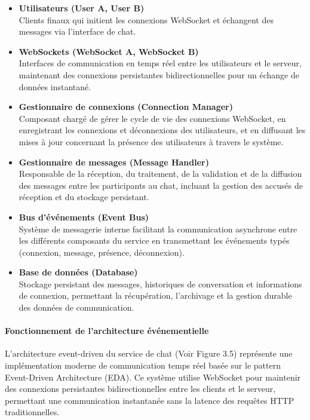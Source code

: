 \documentclass[12pt]{rapportPfe}
\begin{document}
\begin{itemize}
    \item \textbf{Utilisateurs (User A, User B)} \\
    Clients finaux qui initient les connexions WebSocket et échangent des messages via l'interface de chat.
    
    \item \textbf{WebSockets (WebSocket A, WebSocket B)} \\
    Interfaces de communication en temps réel entre les utilisateurs et le serveur, maintenant des connexions persistantes bidirectionnelles pour un échange de données instantané.
    
    \item \textbf{Gestionnaire de connexions (Connection Manager)} \\
    Composant chargé de gérer le cycle de vie des connexions WebSocket, en enregistrant les connexions et déconnexions des utilisateurs, et en diffusant les mises à jour concernant la présence des utilisateurs à travers le système.
    
    \item \textbf{Gestionnaire de messages (Message Handler)} \\
    Responsable de la réception, du traitement, de la validation et de la diffusion des messages entre les participants au chat, incluant la gestion des accusés de réception et du stockage persistant.
    
    \item \textbf{Bus d'événements (Event Bus)} \\
    Système de messagerie interne facilitant la communication asynchrone entre les différents composants du service en transmettant les événements typés (connexion, message, présence, déconnexion).
    
    \item \textbf{Base de données (Database)} \\
    Stockage persistant des messages, historiques de conversation et informations de connexion, permettant la récupération, l'archivage et la gestion durable des données de communication.
\end{itemize}

\paragraph{Fonctionnement de l'architecture événementielle}

L'architecture event-driven du service de chat (Voir Figure 3.5) représente une implémentation moderne de communication temps réel basée sur le pattern Event-Driven Architecture (EDA). Ce système utilise WebSocket pour maintenir des connexions persistantes bidirectionnelles entre les clients et le serveur, permettant une communication instantanée sans la latence des requêtes HTTP traditionnelles. 
\end{document}

